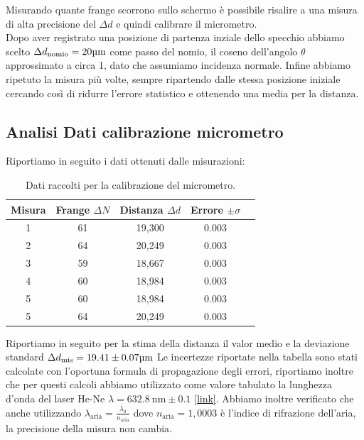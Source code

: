 \documentclass[letterpaper,12pt]{article}
\begin{document}
Misurando quante frange scorrono sullo schermo è possibile risalire a una misura di alta precisione
del $\Delta d$ e quindi calibrare il micrometro.\\
Dopo aver registrato una posizione di partenza inziale dello specchio abbiamo scelto $\Delta d_\text{nomio} = 20\text{\SIUnitSymbolMicro m}$ come passo del nomio,
 il coseno dell'angolo $\theta$ approssimato a circa 1, dato che assumiamo incidenza normale.
Infine abbiamo ripetuto la misura più volte, sempre ripartendo
dalle stessa posizione iniziale cercando così di ridurre l'errore 
statistico e ottenendo una media per la distanza.


\subsection{Analisi Dati calibrazione micrometro}
Riportiamo in seguito i dati ottenuti dalle misurazioni:
\begin{table}[h!]
    \centering
    \begin{tabular}{|c|c|c|c|c|}
    \hline
    \textbf{Misura} & \textbf{Frange $\Delta N$} & \textbf{Distanza $\Delta d$} & \textbf{Errore $\pm\sigma$}  \\
    \hline
    1 & 61 & 19,300 & 0.003 \\
    2 & 64 & 20,249 & 0.003 \\
    3 & 59 & 18,667 & 0.003 \\
    4 & 60 & 18,984 & 0.003 \\
    5 & 60 & 18,984 & 0.003 \\
    5 & 64 & 20,249 & 0.003 \\
    \hline
    \end{tabular}
    \caption{Dati raccolti per la calibrazione del micrometro.}
    \label{tab:calibrazione_micrometro}
    \end{table}

Riportiamo in seguito per la stima della distanza il valor medio e la deviazione standard $\Delta d_\text{mis} = 19.41 \pm0.07\text{\SIUnitSymbolMicro m} $
Le incertezze riportate nella tabella sono stati calcolate con l'oportuna formula di propagazione degli errori, riportiamo  inoltre
che per questi calcoli abbiamo utilizzato come valore tabulato la lunghezza d'onda del laser He-Ne $\lambda = \SI{632.8}{\nano\meter} \pm0.1$ \href{https://www.pasco.com/products/lab-apparatus/light-and-optics/advanced-optics/os-9255}{[link]}.
Abbiamo inoltre verificato che anche utilizzando $\lambda_\text{aria} = \frac{\lambda_0}{n_\text{aria}}$ dove $n_\text{aria} = 1,0003$ è l'indice di rifrazione dell'aria, la precisione della misura non cambia.
\end{document}

